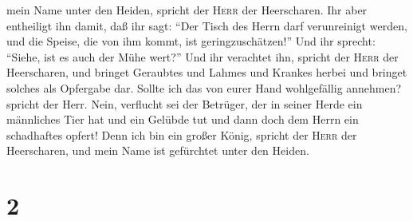 mein Name unter den Heiden, spricht der \textsc{Herr} der Heerscharen.
 Ihr aber entheiligt ihn damit, daß ihr sagt: ``Der Tisch
des Herrn darf verunreinigt werden, und die Speise, die von ihm kommt,
ist geringzuschätzen!''  Und ihr sprecht: ``Siehe, ist es
auch der Mühe wert?'' Und ihr verachtet ihn, spricht der \textsc{Herr}
der Heerscharen, und bringet Geraubtes und Lahmes und Krankes herbei und
bringet solches als Opfergabe dar. Sollte ich das von eurer Hand
wohlgefällig annehmen? spricht der Herr.  Nein, verflucht
sei der Betrüger, der in seiner Herde ein männliches Tier hat und ein
Gelübde tut und dann doch dem Herrn ein schadhaftes opfert! Denn ich bin
ein großer König, spricht der \textsc{Herr} der Heerscharen, und mein
Name ist gefürchtet unter den Heiden.

\hypertarget{section-1}{%
\section{2}\label{section-1}}


